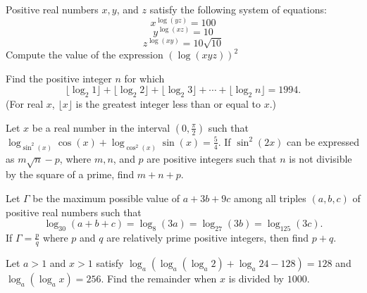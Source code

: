 \documentclass[mast]{lucky}
\begin{document}
\begin{prob}{4}
Positive real numbers $x, y$, and $z$ satisfy the following system of equations:
$$x^{\log(yz)} = 100$$
$$y^{\log(xz)} = 10$$
$$z^{\log(xy)} = 10\sqrt{10}$$
Compute the value of the expression $(\log(xyz))^2$
\end{prob}

\begin{prob}[AIME 1994/4]{4}
Find the positive integer $n$ for which \[ \lfloor \log_2{1}\rfloor+\lfloor\log_2{2}\rfloor+\lfloor\log_2{3}\rfloor+\cdots+\lfloor\log_2{n}\rfloor=1994.  \]  (For real $x$, $\lfloor x\rfloor$ is the greatest integer less than or equal to $x$.)
\end{prob}

\begin{prob}{6}
Let $x$ be a real number in the interval $(0,\frac{\pi}{2})$ such that
$\log_{\sin^2(x)} \cos(x) + \log_{\cos^2(x)} \sin(x) = \frac{5}{4}$.
If $\sin^2(2x)$ can be expressed as $m\sqrt{n} -p$, where $m, n$, and $p$ are positive integers such
that $n$ is not divisible by the square of a prime, find $m + n + p$.
\end{prob}

\begin{prob}{6}
Let $\Gamma$ be the maximum possible value of $a+3b+9c$ among all triples $(a,b,c)$ of positive real numbers such that
\[ \log_{30}(a+b+c) = \log_{8}(3a) = \log_{27} (3b) = \log_{125} (3c) .\]If $\Gamma = \frac{p}{q}$ where $p$ and $q$ are relatively prime positive integers, then find $p+q$.
\end{prob}

\begin{prob}[AIME I 2017/14]{9}
Let $a > 1$ and $x > 1$ satisfy $\log_a(\log_a(\log_a 2) + \log_a 24 - 128) = 128$ and $\log_a(\log_a x) = 256$. Find the remainder when $x$ is divided by $1000$.
\end{prob}
\end{document}
